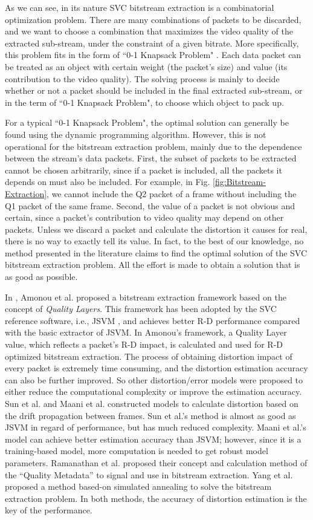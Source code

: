 \documentclass[journal]{IEEEtran}
\begin{document}
As we can see, in its nature SVC bitstream extraction is a combinatorial optimization problem. There are many combinations of packets to be discarded, and we want to choose a combination that maximizes the video quality of the extracted sub-stream, under the constraint of a given bitrate. More specifically, this problem fits in the form of ``0-1 Knapsack Problem" \cite{Knapsack}. Each data packet can be treated as an object with certain weight (the packet's size) and value (its contribution to the video quality). The solving process is mainly to decide whether or not a packet should be included in the final extracted sub-stream, or in the term of ``0-1 Knapsack Problem", to choose which object to pack up.

For a typical ``0-1 Knapsack Problem", the optimal solution can generally be found using the dynamic programming algorithm. However, this is not operational for the bitstream extraction problem, mainly due to the dependence between the stream's data packets. First, the subset of packets to be extracted cannot be chosen arbitrarily, since if a packet is included, all the packets it depends on must also be included. For example, in Fig. \ref{fig:Bitstream-Extraction}, we cannot include the Q2 packet of a frame without including the Q1 packet of the same frame. Second, the value of a packet is not obvious and certain, since a packet's contribution to video quality may depend on other packets. Unless we discard a packet and calculate the distortion it causes for real, there is no way to exactly tell its value. In fact, to the best of our knowledge, no method presented in the literature claims to find the optimal solution of the SVC bitstream extraction problem. All the effort is made to obtain a solution that is as good as possible.

In \cite{Amonou07}, Amonou et al. proposed a bitstream extraction framework based on the concept of \textit{Quality Layers}. This framework has been adopted by the SVC reference software, i.e., JSVM  \cite{JSVM}, and achieves better R-D performance compared with the basic extractor of JSVM. In Amonou's framework, a Quality Layer value, which reflects a packet's R-D impact, is calculated and used for R-D optimized bitstream extraction. The process of obtaining distortion impact of every packet is extremely time consuming, and the distortion estimation accuracy can also be further improved. So other distortion/error models were proposed to either reduce the computational complexity or improve the estimation accuracy. Sun et al. \cite{Sun09} and Maani et al. \cite{Maani09} constructed models to calculate distortion based on the drift propagation between frames. Sun et al.'s method is almost as good as JSVM in regard of performance, but has much reduced complexity. Maani et al.'s model can achieve better estimation accuracy than JSVM; however, since it is a training-based model, more computation is needed to get robust model parameters.
Ramanathan et al. \cite{Ramanathan12} proposed their concept and calculation method of the ``Quality Metadata'' to signal and use in bitstream extraction. Yang et al. \cite{Yang13} proposed a method based-on simulated annealing to solve the bitstream extraction problem. In both methods, the accuracy of distortion estimation is the key of the performance.
\end{document}
